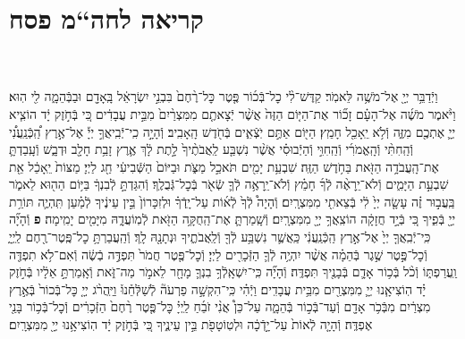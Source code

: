 \documentclass[twoside, openany, parskip=half, 11pt]{book}
\begin{document}
\begin{footnotesize}
\begin{multicols}{2}
\end{multicols}

\section[חה“מ פסח]{קריאה לחה“מ פסח}


\begin{multicols}{2}

\\ \\
וַיְֿדַבֵּ֥ר יְיָ֖ אֶל־מֹשֶׁ֥ה לֵּאמֹֽר׃ קַדֶּשׁ־לִ֨י כׇל־בְּֿכ֜וֹר פֶּ֤טֶר כׇּל־רֶ֨חֶם֙ בִּבְנֵ֣י יִשְׂרָאֵ֔ל בָּֽאָדָ֖ם וּבַבְּֿהֵמָ֑ה לִ֖י הֽוּא׃ וַיֹּ֨אמֶר מֹשֶׁ֜ה אֶל־הָעָ֗ם זָכ֞וֹר אֶת־הַיּ֤וֹם הַזֶּה֙ אֲשֶׁ֨ר יְֿצָאתֶ֤ם מִמִּצְרַ֨יִם֙ מִבֵּ֣ית עֲבָדִ֔ים כִּ֚י בְּֿחֹ֣זֶק יָ֔ד הוֹצִ֧יא יְיָ֛ אֶתְכֶ֖ם מִזֶּ֑ה וְֿלֹ֥א יֵֽאָכֵ֖ל חָמֵֽץ׃ הַיּ֖וֹם אַתֶּ֣ם יֹֽצְֿאִ֑ים בְּֿחֹ֖דֶשׁ הָֽאָבִֽיב׃
וְֿהָיָ֣ה כִֽי־יְֿבִֽיאֲךָ֣ יְיָ֡ אֶל־אֶ֣רֶץ הַֽ֠כְּֿנַֽעֲנִ֠י וְֿהַֽחִתִּ֨י וְֿהָֽאֱמֹרִ֜י וְֿהַֽחִוִּ֣י וְֿהַיְֿבוּסִ֗י אֲשֶׁ֨ר נִשְׁבַּ֤ע לַֽאֲבֹתֶ֨יךָ֙ לָ֣תֶת לָ֔ךְ אֶ֛רֶץ זָבַ֥ת חָלָ֖ב וּדְבָ֑שׁ וְֿעָֽבַדְתָּ֛ אֶת־הָֽעֲבֹדָ֥ה הַזֹּ֖את בַּחֹ֥דֶשׁ הַזֶּֽה׃ שִׁבְעַ֥ת יָמִ֖ים תֹּאכַ֣ל מַצֹּ֑ת וּבַיּוֹם֙ הַשְּֿׁבִיעִ֔י חַ֖ג לַיְיָ׃ מַצּוֹת֙ יֵֽאָכֵ֔ל אֵ֖ת שִׁבְעַ֣ת הַיָּמִ֑ים וְֿלֹא־יֵֽרָאֶ֨ה לְֿךָ֜ חָמֵ֗ץ וְֿלֹא־יֵֽרָאֶ֥ה לְֿךָ֛ שְֿׂאֹ֖ר בְּֿכׇל־גְּֿבֻלֶֽךָ׃ וְֿהִגַּדְתָּ֣ לְֿבִנְךָ֔ בַּיּ֥וֹם הַה֖וּא לֵאמֹ֑ר בַּֽעֲב֣וּר זֶ֗ה עָשָׂ֤ה יְיָ֙ לִ֔י בְּֿצֵאתִ֖י מִמִּצְרָֽיִם׃ וְֿהָיָה֩ לְֿךָ֙ לְֿא֜וֹת עַל־יָֽדְֿךָ֗ וּלְזִכָּרוֹן֙ בֵּ֣ין עֵינֶ֔יךָ לְֿמַ֗עַן תִּֽהְיֶ֛ה תּוֹרַ֥ת יְיָ֖ בְּֿפִ֑יךָ כִּ֚י בְּֿיָ֣ד חֲזָקָ֔ה הוֹצִֽאֲךָ֥ יְיָ֖ מִמִּצְרָֽיִם׃ וְֿשָֽׁמַרְתָּ֛ אֶת־הַֽחֻקָּ֥ה הַזֹּ֖את לְֿמֽוֹעֲדָ֑הּ מִיָּמִ֖ים יָמִֽימָה׃ \textbf{פ}
וְֿהָיָ֞ה כִּֽי־יְֿבִֽאֲךָ֤ יְיָ֙ אֶל־אֶ֣רֶץ הַֽכְּֿנַֽעֲנִ֔י כַּֽאֲשֶׁ֛ר נִשְׁבַּ֥ע לְֿךָ֖ וְֿלַֽאֲבֹתֶ֑יךָ וּנְתָנָ֖הּ לָֽךְ׃ וְֿהַֽעֲבַרְתָּ֥ כׇל־פֶּֽטֶר־רֶ֖חֶם לַֽיְיָ֑ וְֿכׇל־פֶּ֣טֶר שֶׁ֣גֶר בְּֿהֵמָ֗ה אֲשֶׁ֨ר יִהְיֶ֥ה לְֿךָ֛ הַזְּֿכָרִ֖ים לַיְיָ׃ וְֿכׇל־פֶּ֤טֶר חֲמֹר֙ תִּפְדֶּ֣ה בְֿשֶׂ֔ה וְֿאִם־לֹ֥א תִפְדֶּ֖ה וַֽעֲרַפְתּ֑וֹ וְֿכֹ֨ל בְּֿכ֥וֹר אָדָ֛ם בְּֿבָנֶ֖יךָ תִּפְדֶּֽה׃ וְֿהָיָ֞ה כִּֽי־יִשְׁאָֽלְֿךָ֥ בִנְךָ֛ מָחָ֖ר לֵאמֹ֣ר מַה־זֹּ֑את וְֿאָֽמַרְתָּ֣ אֵלָ֔יו בְּֿחֹ֣זֶק יָ֗ד הֽוֹצִיאָ֧נוּ יְיָ֛ מִמִּצְרַ֖יִם מִבֵּ֥ית עֲבָדִֽים׃ וַיְֿהִ֗י כִּֽי־הִקְשָׁ֣ה פַרְעֹה֘ לְֿשַׁלְּֿחֵ֒נוּ֒ וַיַּֽהֲרֹ֨ג יְיָ֤ כׇּל־בְּֿכוֹר֙ בְּֿאֶ֣רֶץ מִצְרַ֔יִם מִבְּֿכֹ֥ר אָדָ֖ם וְֿעַד־בְּֿכ֣וֹר בְּֿהֵמָ֑ה עַל־כֵּן֩ אֲנִ֨י זֹבֵ֜חַ לַֽיְיָ֗ כׇּל־פֶּ֤טֶר רֶ֨חֶם֙ הַזְּֿכָרִ֔ים וְֿכׇל־בְּֿכ֥וֹר בָּנַ֖י אֶפְדֶּֽה׃ וְֿהָיָ֤ה לְֿאוֹת֙ עַל־יָ֣דְֿכָ֔ה וּלְטֽוֹטָפֹ֖ת בֵּ֣ין עֵינֶ֑יךָ כִּ֚י בְּֿחֹ֣זֶק יָ֔ד הֽוֹצִיאָ֥נוּ יְיָ֖ מִמִּצְרָֽיִם׃



\end{multicols}
\end{footnotesize}
\end{document}
